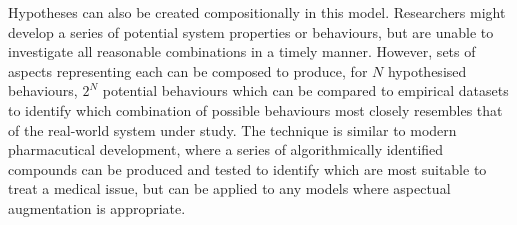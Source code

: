 Hypotheses can also be created compositionally in this model. Researchers might
develop a series of potential system properties or behaviours, but are unable to
investigate all reasonable combinations in a timely manner. However, sets of
aspects representing each can be composed to produce, for $N$ hypothesised
behaviours, $2^N$ potential behaviours which can be compared to empirical
datasets to identify which combination of possible behaviours most closely
resembles that of the real-world system under study. The technique is similar to
modern pharmacutical development, where a series of algorithmically identified
compounds can be produced and tested to identify which are most suitable to
treat a medical issue, but can be applied to any models where aspectual augmentation
is appropriate.

